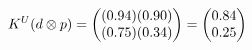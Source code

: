 \documentclass[preview]{standalone}
\begin{document}
\begin{align*}
\special{dvisvgm:raw <g id='unique000'>}K^U(d \otimes p) = \begin{pmatrix} (0.94)(0.90) \\ (0.75)(0.34) \end{pmatrix} = \begin{pmatrix} 0.84 \\ 0.25 \end{pmatrix}\special{dvisvgm:raw </g>}
\end{align*}
\end{document}
